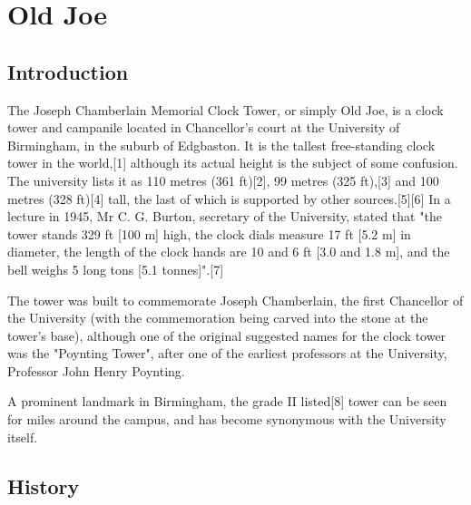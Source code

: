 \chapter{Old Joe}

\section{Introduction}



The Joseph Chamberlain Memorial Clock Tower, or simply Old Joe, is a clock tower and campanile located in Chancellor's court at the University of Birmingham, in the suburb of Edgbaston. It is the tallest free-standing clock tower in the world,[1] although its actual height is the subject of some confusion. The university lists it as 110 metres (361 ft)[2], 99 metres (325 ft),[3] and 100 metres (328 ft)[4] tall, the last of which is supported by other sources.[5][6] In a lecture in 1945, Mr C. G. Burton, secretary of the University, stated that "the tower stands 329 ft [100 m] high, the clock dials measure 17 ft [5.2 m] in diameter, the length of the clock hands are 10 and 6 ft [3.0 and 1.8 m], and the bell weighs 5 long tons [5.1 tonnes]".[7]

The tower was built to commemorate Joseph Chamberlain, the first Chancellor of the University (with the commemoration being carved into the stone at the tower's base), although one of the original suggested names for the clock tower was the "Poynting Tower", after one of the earliest professors at the University, Professor John Henry Poynting.

A prominent landmark in Birmingham, the grade II listed[8] tower can be seen for miles around the campus, and has become synonymous with the University itself. 

\section{History}

